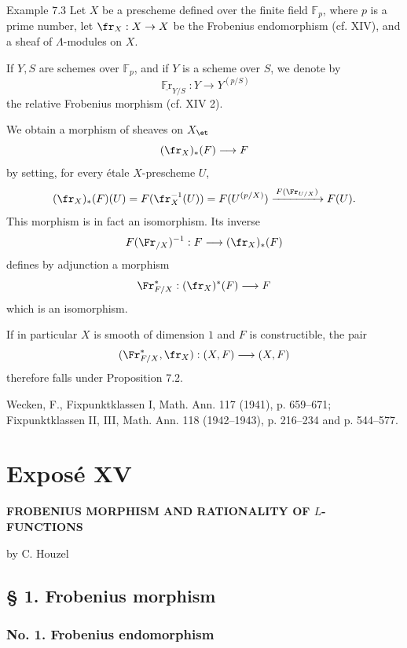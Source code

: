 \begin{statement}{Example 7.3}
Let $X$ be a prescheme defined over the finite field $\mathbb F_p$, where $p$ is a prime number, let $\fr_X:X\to X$ be the Frobenius endomorphism (cf. XIV), and a sheaf of $\Lambda$-modules on $X$.

If $Y,S$ are schemes over $\mathbb F_p$, and if $Y$ is a scheme over $S$, we denote by
\[
\underline{\operatorname{\mathbb{F}r}}_{Y/S}:Y\longrightarrow Y^{(p/S)}
\]
the relative Frobenius morphism (cf. XIV 2).

We obtain a morphism of sheaves on $X_{\et}$
\[
(\fr_X)_*(F)\longrightarrow F
\]
by setting, for every étale $X$-prescheme $U$,
\[
(\fr_X)_*(F)(U)=F(\fr_X^{-1}(U))=F(U^{(p/X)})
 \xrightarrow{\,F(\Fr_{U/X})\,}F(U).
\]
This morphism is in fact an isomorphism. Its inverse
\[
F(\Fr_{/X})^{-1}:F\longrightarrow (\fr_X)_*(F)
\]
defines by adjunction a morphism
\[
\Fr_{F/X}^*:(\fr_X)^*(F)\longrightarrow F
\]
which is an isomorphism.

If in particular $X$ is smooth of dimension $1$ and $F$ is constructible, the pair
\[
(\Fr_{F/X}^*,\fr_X):(X,F)\longrightarrow (X,F)
\]
therefore falls under Proposition 7.2.
\end{statement}

\noindent[1] Wecken, F., Fixpunktklassen I, Math. Ann. 117 (1941), p. 659--671; Fixpunktklassen II, III, Math. Ann. 118 (1942--1943), p. 216--234 and p. 544--577.

\section*{Exposé XV}
\begin{center}
\Large\bfseries FROBENIUS MORPHISM AND RATIONALITY OF $L$-FUNCTIONS

\medskip
by C. Houzel
\end{center}

\subsection*{§ 1. Frobenius morphism}

\subsubsection*{No. 1. Frobenius endomorphism}

